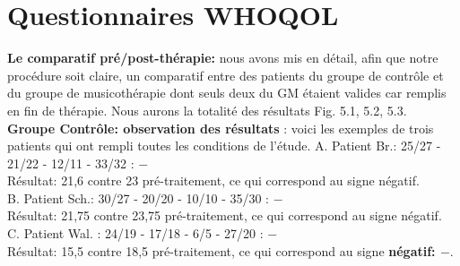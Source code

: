    
   
   \section{Questionnaires WHOQOL}
   \textbf{Le comparatif pré/post-thérapie:}
   nous avons mis en détail, afin que notre procédure soit claire, un comparatif entre des patients du 
   groupe de contrôle et du groupe de 
   musicothérapie dont  seuls deux du GM étaient valides car remplis en fin de thérapie. Nous aurons la 
   totalité des 
   résultats Fig. 5.1, 5.2, 5.3.
   	\\
   \textbf{Groupe Contrôle: observation des résultats}
   : voici les exemples de trois patients qui ont rempli toutes les conditions de l'étude.
   	A. Patient Br.:  25/27 - 21/22 - 12/11 - 33/32 : $-$
   	\\
   	Résultat: 21,6 contre 23 pré-traitement,  ce qui
   	correspond au signe négatif.
   	\\
   	B. Patient Sch.: 30/27 - 20/20 -  10/10 - 35/30 :  $-$
   	\\
   	Résultat: 21,75 contre 23,75 pré-traitement, ce qui
   	correspond au signe négatif.
   	\\
   	C. Patient Wal. : 24/19 -  17/18 - 6/5 -
   	27/20 :   $-$
   	\\
   	Résultat: 15,5 contre 18,5 pré-traitement, ce qui
   	correspond au signe \textbf{négatif:  $-$}.
   	\\
   
